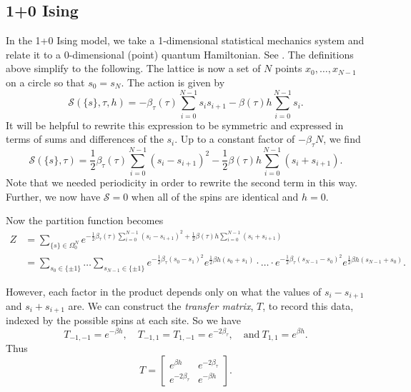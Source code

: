 \documentclass[11pt,reqno]{amsart}
\numberwithin{equation}{section}
\begin{document}
	\subsection{1+0 Ising}
	
	In the 1+0 Ising model, we take a 1-dimensional statistical mechanics system and relate it to a 0-dimensional (point) quantum Hamiltonian. See \cite{FradkinSusskind78,KogutGaugeSummary}.
	The definitions above simplify to the following. The lattice is now a set of $N$ points $x_0,\ldots,x_{N-1}$ on a circle so that $s_0=s_N$. The action is given by 
		\[\mathcal{S}(\{s\},\tau, h)=-\beta_\tau(\tau)\sum_{i=0}^{N-1} s_is_{i+1} - \beta(\tau)h\sum_{i=0}^{N-1}s_i. \] 
	It will be helpful to rewrite this expression to be symmetric and expressed in terms of sums and differences of the $s_i$. 
	Up to a constant factor of $-\beta_\tau N$, we find
		\[\mathcal{S}(\{s\},\tau)=\frac{1}{2}\beta_\tau(\tau)\sum_{i=0}^{N-1} (s_i-s_{i+1})^2 - \frac{1}{2}\beta(\tau)h\sum_{i=0}^{N-1}(s_i+s_{i+1}). \]
	Note that we needed periodicity in order to rewrite the second term in this way. Further, we now have $\mathcal{S}=0$ when all of the spins are identical and $h=0$.
	
	Now the partition function becomes 
	\begin{align*}
		Z&=\sum_{\{s\}\in\Omega_0^N} e^{-\frac{1}{2}\beta_\tau(\tau)\sum_{i=0}^{N-1} (s_i-s_{i+1})^2 + \frac{1}{2}\beta(\tau)h\sum_{i=0}^{N-1}(s_i+s_{i+1})} \\
		&=\sum_{s_0 \in \{\pm 1\}} \ldots \sum_{s_{N-1}\in \{\pm 1\}} e^{-\frac{1}{2}\beta_\tau (s_0-s_1)^2}e^{\frac{1}{2}\beta h(s_0+s_1)}\cdot\ldots\cdot e^{-\frac{1}{2}\beta_\tau (s_{N-1}-s_0)^2}e^{\frac{1}{2}\beta h(s_{N-1}+s_0)}.
	\end{align*}
	
	However, each factor in the product depends only on what the values of $s_i-s_{i+1}$ and $s_i+s_{i+1}$ are. 
	We can construct the \emph{transfer matrix}, $T$, to record this data, indexed by the possible spins at each site.
	So we have 
	\[T_{-1,-1}=e^{-\beta h}, \quad T_{-1,1}=T_{1,-1}=e^{-2\beta_\tau}, \quad \text{and}\ T_{1,1}=e^{\beta h}. \] 
	Thus \[T=\begin{bmatrix}
	e^{\beta h} & e^{-2\beta_\tau} \\
	e^{-2\beta_\tau} & e^{-\beta h}
	\end{bmatrix}. \]
	
\end{document}
